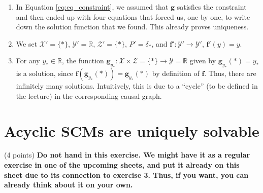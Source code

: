 \begin{gradedsolution}
\begin{enumerate}
\begin{align*}
	  = \begin{pmatrix} 3y - 4 \\ y - (3y - 4) \\ 2(3y - 4) \\ -2y + 4 + (6y - 8) \cdot (3y - 4)\end{pmatrix} \\
	  & = \begin{pmatrix} 3y - 4 \\ -2y + 4 \\ 6y - 8 \\ 18y^{2} - 50y + 36 \end{pmatrix}
	  = \boldsymbol{g}(y),
	  \label{eq:verify_solution}
	\end{align*}
	which verifies the solution.
      \item In Equation \eqref{eq:eq_constraint}, we assumed that $\boldsymbol{g}$ satisfies the constraint and then ended up with four equations that forced us, one by one, to write down the solution function that we found.
	This already proves uniqueness.
      \item We set $\boldsymbol{\mathcal{X}}' = \{*\}$, $\boldsymbol{\mathcal{Y}}' = \mathbb{R}$, $\boldsymbol{\mathcal{Z}}' = \{*\}$, $P' = \delta_{*}$, and $\boldsymbol{f}': \boldsymbol{\mathcal{Y}}' \to \boldsymbol{\mathcal{Y}}'$, $\boldsymbol{f}'(y) = y$.
      \item For any $y_* \in \mathbb{R}$, the function $\boldsymbol{g}_{y_*}: \boldsymbol{\mathcal{X}} \times \boldsymbol{\mathcal{Z}} = \{*\} \to \boldsymbol{\mathcal{Y}} = \mathbb{R}$ given by $\boldsymbol{g}_{y_*}(*) = y_*$ is a solution, since $\boldsymbol{f}(\boldsymbol{g}_{y_*}(*)) = \boldsymbol{g}_{y_*}(*)$ by definition of $\boldsymbol{f}$.
	Thus, there are infinitely many solutions. 
	Intuitively, this is due to a ``cycle'' (to be defined in the lecture) in the corresponding causal graph.
      \end{enumerate}
  \end{gradedsolution}








\section{Acyclic SCMs are uniquely solvable}
(4 points)
\textbf{Do not hand in this exercise. 
  We might have it as a regular exercise in one of the upcoming sheets, and put it already on this sheet due to its connection to exercise 3.
Thus, if you want, you can already think about it on your own.} \\

